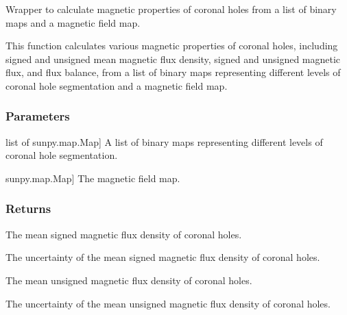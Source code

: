 \documentclass[letterpaper,10pt,english]{sphinxmanual}
\begin{document}

\begin{fulllineitems}
\label{\detokenize{pycatch/utils/ch_mapping:pycatch.utils.ch_mapping.catch_mag}}
\pysigstartsignatures
{}
\pysigstopsignatures
\sphinxAtStartPar
Wrapper to calculate magnetic properties of coronal holes from a list of binary maps and a magnetic field map.

\sphinxAtStartPar
This function calculates various magnetic properties of coronal holes, including signed and unsigned mean magnetic flux density, signed and unsigned magnetic flux, and flux balance, from a list of binary maps representing different levels of coronal hole segmentation and a magnetic field map.


\subsubsection{Parameters}
\label{\detokenize{pycatch/utils/ch_mapping:id3}}\begin{description}
\sphinxlineitem{binmaps}{[}list of sunpy.map.Map{]}
\sphinxAtStartPar
A list of binary maps representing different levels of coronal hole segmentation.

\sphinxlineitem{magmap}{[}sunpy.map.Map{]}
\sphinxAtStartPar
The magnetic field map.

\end{description}


\subsubsection{Returns}
\label{\detokenize{pycatch/utils/ch_mapping:id4}}\begin{description}
\sphinxAtStartPar
The mean signed magnetic flux density of coronal holes.

\sphinxAtStartPar
The uncertainty of the mean signed magnetic flux density of coronal holes.

\sphinxAtStartPar
The mean unsigned magnetic flux density of coronal holes.

\sphinxAtStartPar
The uncertainty of the mean unsigned magnetic flux density of coronal holes.


\end{description}
\end{fulllineitems}
\end{document}
